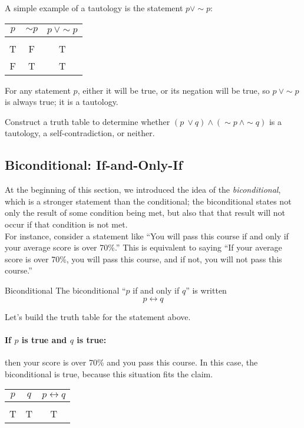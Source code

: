 A simple example of a tautology is the statement $p \vee \sim p$:
\begin{center}
\begin{tabular}{|c c c|}
\hline
$p$ & $\sim p$ & $p\ \vee \sim p$\\
\hline
& & \\
T & F & T\\
F & T & T\\
\hline
\end{tabular}
\end{center}
For any statement $p$, either it will be true, or its negation will be true, so $p\ \vee \sim p$ is always true; it is a tautology.

\begin{try}
Construct a truth table to determine whether $(p\ \vee q) \wedge (\sim p\ \wedge \sim q)$ is a tautology, a self-contradiction, or neither.
\end{try}

\subsection{Biconditional: If-and-Only-If}
At the beginning of this section, we introduced the idea of the \textit{biconditional}, which is a stronger statement than the conditional; the biconditional states not only the result of some condition being met, but also that that result will not occur if that condition is not met.\\

For instance, consider a statement like ``You will pass this course if and only if your average score is over 70\%.''  This is equivalent to saying ``If your average score is over 70\%, you will pass this course, and if not, you will not pass this course.''  

\begin{proc}{Biconditional}
The biconditional ``$p$ if and only if $q$'' is written \[p \leftrightarrow q\]
\end{proc}

Let's build the truth table for the statement above.

\paragraph{If $p$ is true and $q$ is true:} then your score is over 70\% and you pass this course.  In this case, the biconditional is true, because this situation fits the claim.
\begin{center}
\begin{tabular}{c c c}
$p$ & $q$ & $p \leftrightarrow q$\\
\hline
& & \\
T & T & T
\end{tabular}
\end{center}

